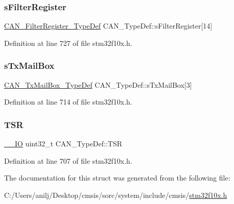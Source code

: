\mbox{\label{struct_c_a_n___type_def_ab8ad52d839d4bcea4ce3502a4d279ff1}} 
\subsubsection{\texorpdfstring{s\+Filter\+Register}{sFilterRegister}}
{\footnotesize\ttfamily \hyperlink{struct_c_a_n___filter_register___type_def}{C\+A\+N\+\_\+\+Filter\+Register\+\_\+\+Type\+Def} C\+A\+N\+\_\+\+Type\+Def\+::s\+Filter\+Register\mbox{[}14\mbox{]}}



Definition at line 727 of file stm32f10x.\+h.

\mbox{\label{struct_c_a_n___type_def_a328925e230f68a775f6f4ad1076c27ce}} 
\subsubsection{\texorpdfstring{s\+Tx\+Mail\+Box}{sTxMailBox}}
{\footnotesize\ttfamily \hyperlink{struct_c_a_n___tx_mail_box___type_def}{C\+A\+N\+\_\+\+Tx\+Mail\+Box\+\_\+\+Type\+Def} C\+A\+N\+\_\+\+Type\+Def\+::s\+Tx\+Mail\+Box\mbox{[}3\mbox{]}}



Definition at line 714 of file stm32f10x.\+h.

\mbox{\label{struct_c_a_n___type_def_acbc82ac4e87e75350fc586be5e56d95b}} 
\subsubsection{\texorpdfstring{T\+SR}{TSR}}
{\footnotesize\ttfamily \hyperlink{core__sc300_8h_aec43007d9998a0a0e01faede4133d6be}{\+\_\+\+\_\+\+IO} uint32\+\_\+t C\+A\+N\+\_\+\+Type\+Def\+::\+T\+SR}



Definition at line 707 of file stm32f10x.\+h.



The documentation for this struct was generated from the following file\+:\begin{DoxyCompactItemize}
\item 
C\+:/\+Users/anilj/\+Desktop/cmsis/sorc/system/include/cmsis/\hyperlink{stm32f10x_8h}{stm32f10x.\+h}\end{DoxyCompactItemize}
